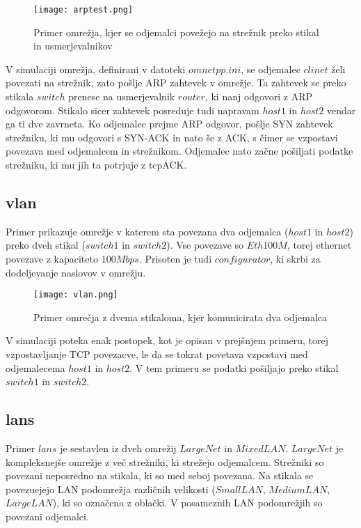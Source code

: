 \begin{figure}[H]
    \centering
    \texttt{[image: arptest.png]}
    \caption{Primer omrežja, kjer se odjemalci povežejo na strežnik preko stikal in usmerjevalnikov} 
    \label{fig:arptest}
\end{figure}

V simulaciji omrežja, definirani v datoteki $omnetpp.ini$, se odjemalec $clinet$ želi povezati na strežnik, zato pošlje ARP zahtevek v omrežje. Ta zahtevek se preko stikala $switch$ prenese na usmerjevalnik $router$, ki nanj odgovori z ARP odgovorom. Stikalo sicer zahtevek posreduje tudi napravam $host1$ in $host2$ vendar ga ti dve zavrneta. Ko odjemalec prejme ARP odgovor, pošlje SYN zahtevek strežniku, ki mu odgovori s SYN-ACK in nato še z ACK, s čimer se vzpostavi povezava med odjemalcem in strežnikom. Odjemalec nato začne pošiljati podatke strežniku, ki mu jih ta potrjuje z tcpACK.

\newpage

\subsection{vlan}

Primer prikazuje omrežje v katerem sta povezana dva odjemalca ($host1$ in $host2$) preko dveh stikal ($switch1$ in $switch2$). Vse povezave so $Eth100M$, torej ethernet povezave z kapaciteto $100Mbps$. Prisoten je tudi $configurator$, ki skrbi za dodeljevanje naslovov v omrežju.

\begin{figure}[H]
    \centering
    \texttt{[image: vlan.png]}
    \caption{Primer omrečja z dvema stikaloma, kjer komunicirata dva odjemalca} 
    \label{fig:vlan}
\end{figure}

V simulaciji poteka enak postopek, kot je opisan v prejšnjem primeru, torej vzpostavljanje TCP povezacve, le da se tokrat povetava vzpostavi med odjemalecema $host1$ in $host2$. V tem primeru se podatki pošiljajo preko stikal $switch1$ in $switch2$.

\newpage

\subsection{lans}

Primer $lans$ je sestavlen iz dveh omrežij $LargeNet$ in $MixedLAN$. $LargeNet$ je kompleksnejše omrežje z več strežniki, ki strežejo odjemalcem. Strežniki so povezani neposredno na stikala, ki so med seboj povezana. Na stikala se povezuejejo LAN podomrežja različnih velikosti ($SmallLAN$, $MediumLAN$, $LargeLAN$), ki so označena z oblački. V posameznih LAN podomrežjih so povezani odjemalci.


